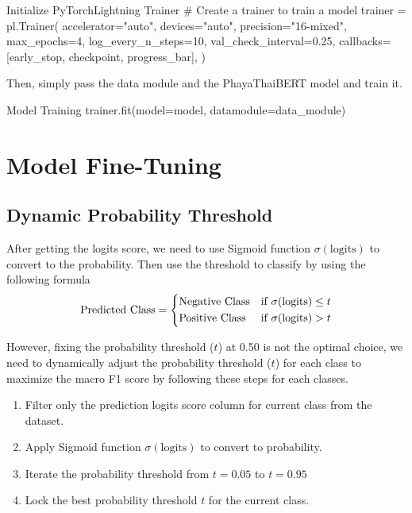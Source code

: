 \documentclass[12pt, a4paper]{article}
\begin{document}
                \begin{codeblock}{Initialize PyTorchLightning Trainer}
                    # Create a trainer to train a model
                        trainer = pl.Trainer(
                            accelerator="auto",
                            devices="auto",
                            precision="16-mixed",
                            max_epochs=4,
                            log_every_n_steps=10,
                            val_check_interval=0.25,
                            callbacks=[early_stop, checkpoint, progress_bar],
                        )
                \end{codeblock}

                \noindent Then, simply pass the data module and the PhayaThaiBERT model and train it.

                \begin{codeblock}{Model Training}
                    trainer.fit(model=model, datamodule=data_module)
                \end{codeblock}

    \pagebreak

        \section{Model Fine-Tuning}
            \subsection{Dynamic Probability Threshold}
                After getting the logits score, we need to use Sigmoid function $\sigma(\text{logits})$ to convert to the probability.
                Then use the threshold to classify by using the following formula
                $$
                    \text{Predicted Class} =
                    \begin{dcases}
                        \text{Negative Class} & \text{if } \sigma(\text{logits}) \leq t \\
                        \text{Positive Class} & \text{if } \sigma(\text{logits}) > t
                    \end{dcases}
                $$
                
                However, fixing the probability threshold ($t$) at 0.50 is not the optimal choice,
                we need to dynamically adjust the probability threshold ($t$) for each class to maximize the macro F1 score
                by following these steps for each classes.
                \begin{enumerate}
                    \item Filter only the prediction logits score column for current class from the dataset.
                    \item Apply Sigmoid function $\sigma(\text{logits})$ to convert to probability.
                    \item Iterate the probability threshold from $t = 0.05$ to $t = 0.95$
                    \item Lock the best probability threshold $t$ for the current class.
                \end{enumerate}
\end{document}
